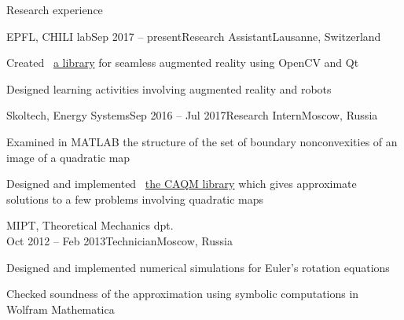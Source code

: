 \documentclass{resume} %
\begin{document}
\begin{rSection}{Research experience}
	\begin{rSubsection}{EPFL, CHILI lab}{Sep 2017 -- present}{Research Assistant}{Lausanne, Switzerland}
		\item Created \faExternalLink~\href{https://github.com/chili-epfl/qml-ar}{a library} for seamless augmented reality using OpenCV and Qt
		\item Designed learning activities involving augmented reality and robots
	\end{rSubsection}
	
	\begin{rSubsection}{Skoltech, Energy Systems}{Sep 2016 -- Jul 2017}{Research Intern}{Moscow, Russia}
		\item Examined in MATLAB the structure of the set of boundary nonconvexities of an image of a quadratic map
		\item Designed and implemented \faExternalLink~\href{https://github.com/sergeivolodin/CAQM}{the CAQM library} which gives approximate solutions to a few problems involving quadratic maps
	\end{rSubsection}
	
	
	\begin{rSubsection}{MIPT, Theoretical Mechanics dpt.}{\\Oct 2012 -- Feb 2013}{Technician}{Moscow, Russia}
		\item Designed and implemented numerical simulations for Euler's rotation equations
		\item Checked soundness of the approximation using symbolic computations in Wolfram Mathematica
	\end{rSubsection}
\end{rSection}
\end{document}
